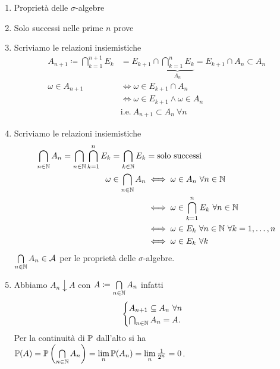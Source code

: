 \begin{enumerate}
	\item Proprietà delle $\sigma $-algebre
	\item Solo successi nelle prime $n$ prove
	\item Scriviamo le relazioni insiemistiche
	\begin{align*}
		A_{n+1} \coloneqq \bigcap\limits_{k=1}^{n+1} E_{k} & =E_{k+1} \cap \underbrace{\bigcap\limits_{k=1}^{n} E_{k}}_{A_{n}} =E_{k+1} \cap A_{n} \subset A_{n}\\
		\omega \in A_{n+1} & \iff \omega \in E_{k+1} \cap A_{n}\\
		 & \iff \omega \in E_{k+1} \land \omega \in A_{n}\\
		 & \text{i.e.} \ A_{n+1} \subset A_{n} \ \forall n
	\end{align*}
	\item Scriviamo le relazioni insiemistiche
	\begin{align*}
		\bigcap\limits_{n\in \mathbb{N}} A_{n} =\bigcap\limits_{n\in \mathbb{N}}\bigcap\limits_{k=1}^{n} E_{k} =\bigcap\limits_{k\in \mathbb{N}} E_{k} & =\text{solo successi}\\
		\omega \in \bigcap\limits_{n\in \mathbb{N}} A_{n} & \iff \omega \in A_{n} \ \forall n\in \mathbb{N}\\
		 & \iff \omega \in \bigcap\limits_{k=1}^{n} E_{k} \ \forall n\in \mathbb{N}\\
		 & \iff \omega \in E_{k} \ \forall n\in \mathbb{N} \ \forall k=1,\dots ,n\\
		 & \iff \omega \in E_{k} \ \forall k
	\end{align*}
	$\bigcap\limits_{n\in \mathbb{N}} A_{n} \in \mathcal{A}$ per le proprietà delle $\sigma $-algebre.
	\item Abbiamo $A_{n} \downarrow A$ con $A\coloneqq \bigcap\limits_{n\in \mathbb{N}} A_{n}$ infatti
	\[
		\begin{cases}
			A_{n+1} \subseteq A_{n} \ \forall n\\
			\bigcap_{n\in \mathbb{N}} A_{n} =A.
		\end{cases}
	\]
	Per la continuità di $\mathbb{P}$ dall'alto si ha $\mathbb{P}(A) =\mathbb{P}\left(\bigcap\limits_{n\in \mathbb{N}} A_{n}\right) =\lim\limits_{n}\mathbb{P}(A_{n}) =\lim\limits_{n}\frac{1}{2^{n}} =0$.
\end{enumerate}

\Soluzione


